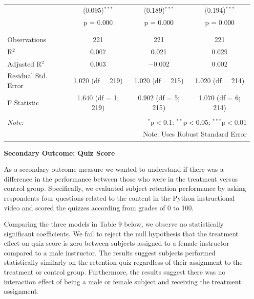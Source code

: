 \documentclass[
]{article}
\begin{document}
\begin{table}[!htbp]
\begin{tabular}{@{\extracolsep{3pt}}lccc}
  & (0.095)$^{***}$ & (0.189)$^{***}$ & (0.194)$^{***}$ \\ 
  & p = 0.000 & p = 0.000 & p = 0.000 \\ 
  & & & \\ 
\hline \\[-1.8ex] 
Observations & 221 & 221 & 221 \\ 
R$^{2}$ & 0.007 & 0.021 & 0.029 \\ 
Adjusted R$^{2}$ & 0.003 & $-$0.002 & 0.002 \\ 
Residual Std. Error & 1.020 (df = 219) & 1.020 (df = 215) & 1.020 (df = 214) \\ 
F Statistic & 1.640 (df = 1; 219) & 0.902 (df = 5; 215) & 1.070 (df = 6; 214) \\ 
\hline 
\hline \\[-1.8ex] 
\textit{Note:}  & \multicolumn{3}{r}{$^{*}$p$<$0.1; $^{**}$p$<$0.05; $^{***}$p$<$0.01} \\ 
 & \multicolumn{3}{r}{Note: Uses Robust Standard Error} \\ 
\end{tabular} 
\end{table}

\textbf{Secondary Outcome: Quiz Score}

As a secondary outcome measure we wanted to understand if there was a
difference in the performance between those who were in the treatment
versus control group. Specifically, we evaluated subject retention
performance by asking respondents four questions related to the content
in the Python instructional video and scored the quizzes according from
grades of 0 to 100.

Comparing the three models in Table 9 below, we observe no statistically
significant coefficients. We fail to reject the null hypothesis that the
treatment effect on quiz score is zero between subjects assigned to a
female instructor compared to a male instructor. The results suggest
subjects performed statistically similarly on the retention quiz
regardless of their assignment to the treatment or control group.
Furthermore, the results suggest there was no interaction effect of
being a male or female subject and receiving the treatment assignment.

\clearpage
\end{document}
